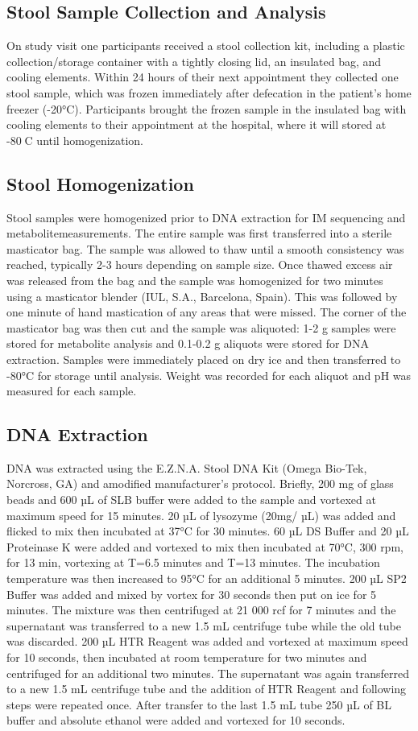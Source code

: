 \subsection{Stool Sample Collection and Analysis}
On study visit one participants received a stool collection kit, including a plastic collection/storage container with a tightly closing lid, an insulated bag, and cooling elements. Within 24 hours of their next appointment they collected one stool sample, which was frozen immediately after defecation in the patient’s home freezer (-20°C). Participants brought the frozen sample in the insulated bag with cooling elements to their appointment at the hospital, where it will stored at -80C until homogenization.

\subsection{Stool Homogenization}
Stool samples were homogenized prior to DNA extraction for IM sequencing and metabolitemeasurements. The entire sample was first transferred into a sterile masticator bag. The sample was allowed to thaw until a smooth consistency was reached, typically 2-3 hours depending on sample size. Once thawed excess air was released from the bag and the sample was homogenized for two minutes using a masticator blender (IUL, S.A., Barcelona, Spain). This was followed by one minute of hand mastication of any areas that were missed. The corner of the masticator bag was then cut and the sample was aliquoted: 1-2 g samples were stored for metabolite analysis and 0.1-0.2 g aliquots were stored for DNA extraction. Samples were immediately placed on dry ice and then transferred to -80°C for storage until analysis. Weight was recorded for each aliquot and pH was measured for each sample.

\subsection{DNA Extraction}
DNA was extracted using the E.Z.N.A. Stool DNA Kit (Omega Bio-Tek, Norcross, GA) and amodified manufacturer’s protocol. Briefly, 200 mg of glass beads and 600 µL of SLB buffer were added to the sample and vortexed at maximum speed for 15 minutes. 20 µL of lysozyme (20mg/ µL) was added and flicked to mix then incubated at 37°C for 30 minutes. 60 µL DS Buffer and 20 µL Proteinase K were added and vortexed to mix then incubated at 70°C, 300 rpm, for 13 min, vortexing at T=6.5 minutes and T=13 minutes. The incubation temperature was then increased to 95°C for an additional 5 minutes. 200 µL SP2 Buffer was added and mixed by vortex for 30 seconds then put on ice for 5 minutes. The mixture was then centrifuged at 21 000 rcf for 7 minutes and the supernatant was transferred to a new 1.5 mL centrifuge tube while the old tube was discarded. 200 µL HTR Reagent was added and vortexed at maximum speed for 10 seconds, then incubated at room temperature for two minutes and centrifuged for an additional two minutes. The supernatant was again transferred to a new 1.5 mL centrifuge tube and the addition of HTR Reagent and following steps were repeated once. After transfer to the last 1.5 mL tube 250 µL of BL buffer and absolute ethanol were added and vortexed for 10 seconds.

